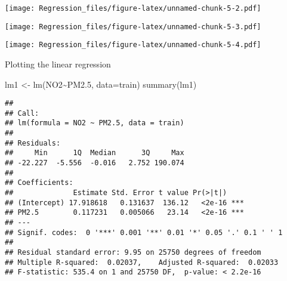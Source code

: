 \documentclass[
]{article}
\newenvironment{Shaded}{\begin{snugshade}}{\end{snugshade}}
\newcommand{\AttributeTok}[1]{\textcolor[rgb]{0.77,0.63,0.00}{#1}}
\newcommand{\FloatTok}[1]{\textcolor[rgb]{0.00,0.00,0.81}{#1}}
\newcommand{\FunctionTok}[1]{\textcolor[rgb]{0.00,0.00,0.00}{#1}}
\newcommand{\NormalTok}[1]{#1}
\newcommand{\OtherTok}[1]{\textcolor[rgb]{0.56,0.35,0.01}{#1}}
\newcommand{\SpecialCharTok}[1]{\textcolor[rgb]{0.00,0.00,0.00}{#1}}
\begin{document}
\begin{Shaded}
\end{Shaded}

\texttt{[image: Regression\_files/figure-latex/unnamed-chunk-5-2.pdf]}

\begin{Shaded}
\end{Shaded}

\texttt{[image: Regression\_files/figure-latex/unnamed-chunk-5-3.pdf]}

\begin{Shaded}
\end{Shaded}

\texttt{[image: Regression\_files/figure-latex/unnamed-chunk-5-4.pdf]}

Plotting the linear regression

\begin{Shaded}
\begin{Highlighting}[]
\NormalTok{lm1 }\OtherTok{\textless{}{-}} \FunctionTok{lm}\NormalTok{(NO2}\SpecialCharTok{\textasciitilde{}}\NormalTok{PM2}\FloatTok{.5}\NormalTok{, }\AttributeTok{data=}\NormalTok{train)}
\FunctionTok{summary}\NormalTok{(lm1)}
\end{Highlighting}
\end{Shaded}

\begin{verbatim}
## 
## Call:
## lm(formula = NO2 ~ PM2.5, data = train)
## 
## Residuals:
##     Min      1Q  Median      3Q     Max 
## -22.227  -5.556  -0.016   2.752 190.074 
## 
## Coefficients:
##              Estimate Std. Error t value Pr(>|t|)    
## (Intercept) 17.918618   0.131637  136.12   <2e-16 ***
## PM2.5        0.117231   0.005066   23.14   <2e-16 ***
## ---
## Signif. codes:  0 '***' 0.001 '**' 0.01 '*' 0.05 '.' 0.1 ' ' 1
## 
## Residual standard error: 9.95 on 25750 degrees of freedom
## Multiple R-squared:  0.02037,    Adjusted R-squared:  0.02033 
## F-statistic: 535.4 on 1 and 25750 DF,  p-value: < 2.2e-16
\end{verbatim}
\end{document}
